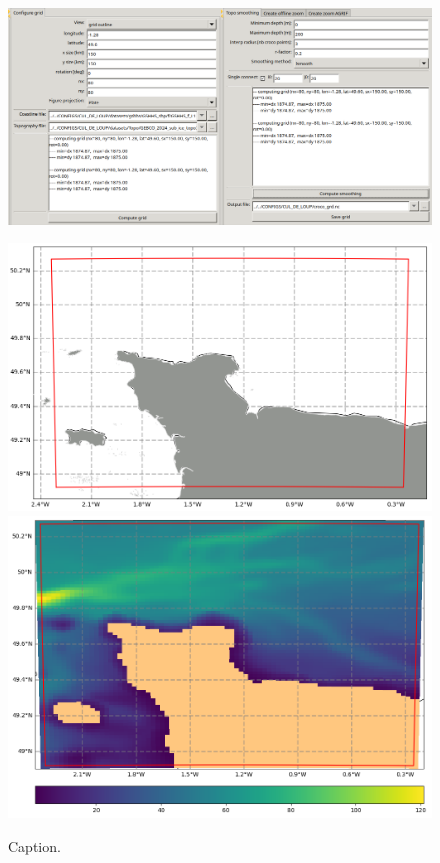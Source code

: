 \documentclass[10pt,a4paper,titlepage]{article}
\begin{document}
    \begin{figure}
        \begin{center}
            \includegraphics[scale=0.4]{../images/makegrid/parameters_main.png}
            
            \includegraphics[scale=0.2]{../images/makegrid/config_main.png}
            \includegraphics[scale=0.2]{../images/makegrid/ismooth_main.png}
            \caption{Caption.}
            \label{make_grid_main}
        \end{center}
    \end{figure}
    
\end{document}
